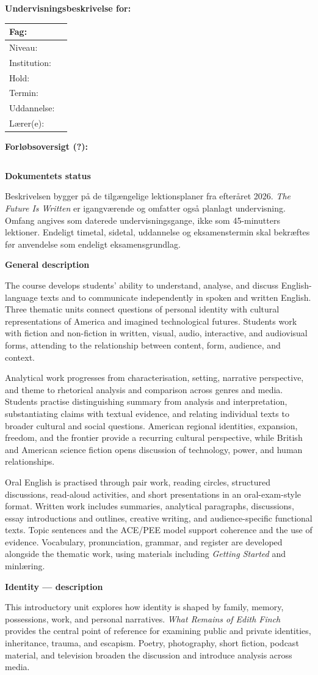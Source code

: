\documentclass[10pt,a4paper]{article}
\makeatletter
\newcommand{\infotabel}{%
  {\large\bfseries\overp\color{frbgreen}%
    Undervisningsbeskrivelse for: \ub@hold\par}%
  \vspace{0.4em}%
  \begin{tabularx}{\linewidth}{|l|X|}
    \hline
    Fag:         & \ub@fag         \\\hline
    Niveau:      & \ub@niveau      \\\hline
    Institution: & \ub@institution \\\hline
    Hold:        & \ub@hold        \\\hline
    Termin:      & \ub@termin      \\\hline
    Uddannelse:  & \ub@uddannelse  \\\hline
    Lærer(e):    & \ub@laerer      \\\hline
  \end{tabularx}%
}
\newcommand{\ub@forlrows}{}
\gdef\ubfinalcnt{?}
\newcommand{\forloebsoversigt}{%
  \vspace{1.5em}%
  {\large\bfseries\overp\color{frbgreen}Forløbsoversigt (\ubfinalcnt):\par}%
  \vspace{0.4em}%
  \begin{tabularx}{\linewidth}{|l|l|X|}
    \hline
    \ub@forlrows
  \end{tabularx}%
}
\makeatother
\begin{document}
\thispagestyle{plain}

\infotabel

\forloebsoversigt

\vspace{1em}
{\large\bfseries\overp\color{frbgreen} Dokumentets status\par}
Beskrivelsen bygger på de tilgængelige lektionsplaner fra efteråret 2026.
\textit{The Future Is Written} er igangværende og omfatter også planlagt undervisning.
Omfang angives som daterede undervisningsgange, ikke som 45-minutters lektioner.
Endeligt timetal, sidetal, uddannelse og eksamenstermin skal bekræftes før anvendelse som endeligt eksamensgrundlag.

\newpage
{\large\bfseries\overp\color{frbgreen} General description\par}
The course develops students' ability to understand, analyse, and discuss English-language texts and to communicate independently in spoken and written English. Three thematic units connect questions of personal identity with cultural representations of America and imagined technological futures. Students work with fiction and non-fiction in written, visual, audio, interactive, and audiovisual forms, attending to the relationship between content, form, audience, and context.

Analytical work progresses from characterisation, setting, narrative perspective, and theme to rhetorical analysis and comparison across genres and media. Students practise distinguishing summary from analysis and interpretation, substantiating claims with textual evidence, and relating individual texts to broader cultural and social questions. American regional identities, expansion, freedom, and the frontier provide a recurring cultural perspective, while British and American science fiction opens discussion of technology, power, and human relationships.

Oral English is practised through pair work, reading circles, structured discussions, read-aloud activities, and short presentations in an oral-exam-style format. Written work includes summaries, analytical paragraphs, discussions, essay introductions and outlines, creative writing, and audience-specific functional texts. Topic sentences and the ACE/PEE model support coherence and the use of evidence. Vocabulary, pronunciation, grammar, and register are developed alongside the thematic work, using materials including \textit{Getting Started} and minlæring.

\newpage
{\large\bfseries\overp\color{frbgreen} Identity --- description\par}
This introductory unit explores how identity is shaped by family, memory, possessions, work, and personal narratives. \textit{What Remains of Edith Finch} provides the central point of reference for examining public and private identities, inheritance, trauma, and escapism. Poetry, photography, short fiction, podcast material, and television broaden the discussion and introduce analysis across media.
\end{document}
